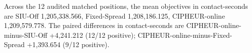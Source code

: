 Across the 12 audited matched positions, the mean objectives in contact-seconds are SIU-Off 1,205,338.566, Fixed-Spread 1,208,186.125, CIPHEUR-online 1,209,579.778. The paired differences in contact-seconds are CIPHEUR-online-minus-SIU-Off +4,241.212 (12/12 positive); CIPHEUR-online-minus-Fixed-Spread +1,393.654 (9/12 positive).
